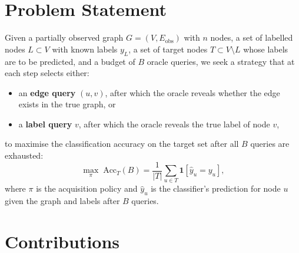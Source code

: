 \documentclass[12pt,a4paper,oneside]{report}
\begin{document}
\section{Problem Statement}

Given a partially observed graph $G = (V, E_{\text{obs}})$ with $n$ nodes, a set of labelled nodes $L \subset V$ with known labels $y_L$, a set of target nodes $T \subset V \setminus L$ whose labels are to be predicted, and a budget of $B$ oracle queries, we seek a strategy that at each step selects either:
\begin{itemize}[leftmargin=2em]
    \item an \textbf{edge query} $(u, v)$, after which the oracle reveals whether the edge exists in the true graph, or
    \item a \textbf{label query} $v$, after which the oracle reveals the true label of node $v$,
\end{itemize}
to maximise the classification accuracy on the target set after all $B$ queries are exhausted:
\begin{equation}
    \max_{\pi} \; \mathrm{Acc}_T(B) = \frac{1}{|T|} \sum_{u \in T} \mathbf{1}[\hat{y}_u = y_u],
\end{equation}
where $\pi$ is the acquisition policy and $\hat{y}_u$ is the classifier's prediction for node $u$ given the graph and labels after $B$ queries.

\section{Contributions}
\end{document}
